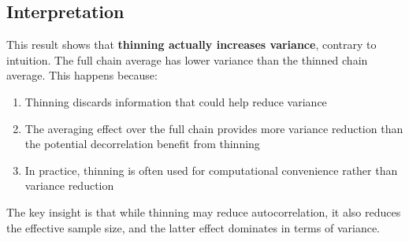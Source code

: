 







\subsection{Interpretation}

This result shows that \textbf{thinning actually increases variance}, contrary to intuition. The full chain average has lower variance than the thinned chain average. This happens because:

\begin{enumerate}
\item Thinning discards information that could help reduce variance
\item The averaging effect over the full chain provides more variance reduction than the potential decorrelation benefit from thinning  
\item In practice, thinning is often used for computational convenience rather than variance reduction
\end{enumerate}

The key insight is that while thinning may reduce autocorrelation, it also reduces the effective sample size, and the latter effect dominates in terms of variance.
